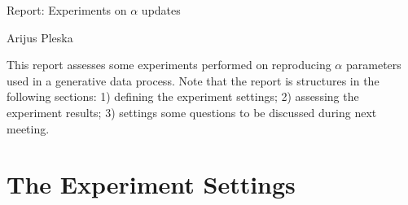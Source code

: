 \documentclass[12pt]{article}
\begin{document}
\begingroup  
  \centering
  \large Report: Experiments on $\alpha$ updates \par
  \large Arijus Pleska \par
\endgroup

\par This report assesses some experiments performed on reproducing $\alpha$ parameters used in a generative data process. Note that the report is structures in the following sections: 1) defining the experiment settings; 2) assessing the experiment results; 3) settings some questions to be discussed during next meeting.

\section*{The Experiment Settings}
\end{document}
